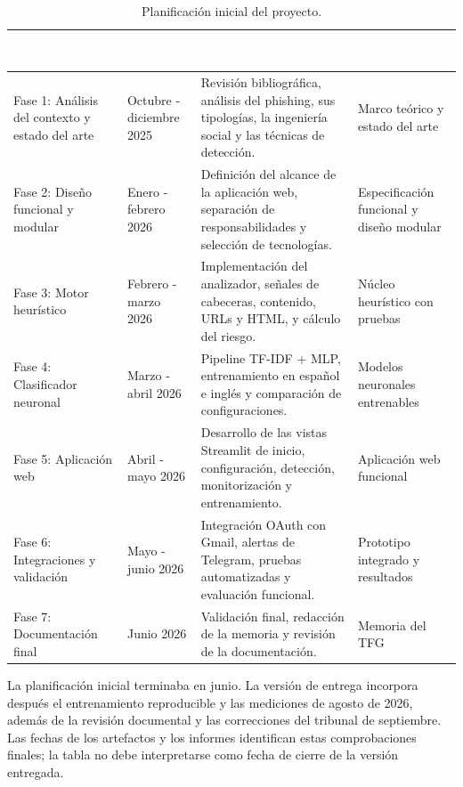 \documentclass[11pt,a4paper,oneside]{report}
\begin{document}
\begingroup
\begin{table}[htbp]
  \centering
  \small
  \caption{Planificación inicial del proyecto.}
  \label{tab:4-1}
  \begin{tabularx}{\textwidth}{|X|X|X|X|}
    \hline
    \rowcolor{uemcgreen}
    \textcolor{white}{\textbf{Fase}} & \textcolor{white}{\textbf{Periodo}} & \textcolor{white}{\textbf{Actividades principales}} & \textcolor{white}{\textbf{Entregable}} \\
    \hline
    Fase 1: Análisis del contexto y estado del arte & Octubre - diciembre 2025 & Revisión bibliográfica, análisis del phishing, sus tipologías, la ingeniería social y las técnicas de detección. & Marco teórico y estado del arte \\
    \hline
    \rowcolor{tablelight}
    Fase 2: Diseño funcional y modular & Enero - febrero 2026 & Definición del alcance de la aplicación web, separación de responsabilidades y selección de tecnologías. & Especificación funcional y diseño modular \\
    \hline
    Fase 3: Motor heurístico & Febrero - marzo 2026 & Implementación del analizador, señales de cabeceras, contenido, URLs y HTML, y cálculo del riesgo. & Núcleo heurístico con pruebas \\
    \hline
    \rowcolor{tablelight}
    Fase 4: Clasificador neuronal & Marzo - abril 2026 & Pipeline TF-IDF + MLP, entrenamiento en español e inglés y comparación de configuraciones. & Modelos neuronales entrenables \\
    \hline
    Fase 5: Aplicación web & Abril - mayo 2026 & Desarrollo de las vistas Streamlit de inicio, configuración, detección, monitorización y entrenamiento. & Aplicación web funcional \\
    \hline
    \rowcolor{tablelight}
    Fase 6: Integraciones y validación & Mayo - junio 2026 & Integración OAuth con Gmail, alertas de Telegram, pruebas automatizadas y evaluación funcional. & Prototipo integrado y resultados \\
    \hline
    Fase 7: Documentación final & Junio 2026 & Validación final, redacción de la memoria y revisión de la documentación. & Memoria del TFG \\
    \hline
  \end{tabularx}
\end{table}
\endgroup

La planificación inicial terminaba en junio. La versión de entrega incorpora después el entrenamiento reproducible y las mediciones de agosto de 2026, además de la revisión documental y las correcciones del tribunal de septiembre. Las fechas de los artefactos y los informes identifican estas comprobaciones finales; la tabla no debe interpretarse como fecha de cierre de la versión entregada.
\end{document}
